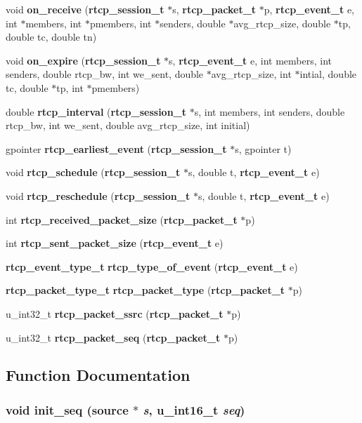 \begin{CompactItemize}
\item 
void {\bf on\_\-receive} ({\bf rtcp\_\-session\_\-t} $\ast$s, {\bf rtcp\_\-packet\_\-t} $\ast$p, {\bf rtcp\_\-event\_\-t} e, int $\ast$members, int $\ast$pmembers, int $\ast$senders, double $\ast$avg\_\-rtcp\_\-size, double $\ast$tp, double tc, double tn)
\item 
void {\bf on\_\-expire} ({\bf rtcp\_\-session\_\-t} $\ast$s, {\bf rtcp\_\-event\_\-t} e, int members, int senders, double rtcp\_\-bw, int we\_\-sent, double $\ast$avg\_\-rtcp\_\-size, int $\ast$intial, double tc, double $\ast$tp, int $\ast$pmembers)
\item 
double {\bf rtcp\_\-interval} ({\bf rtcp\_\-session\_\-t} $\ast$s, int members, int senders, double rtcp\_\-bw, int we\_\-sent, double avg\_\-rtcp\_\-size, int initial)
\item 
gpointer {\bf rtcp\_\-earliest\_\-event} ({\bf rtcp\_\-session\_\-t} $\ast$s, gpointer t)
\item 
void {\bf rtcp\_\-schedule} ({\bf rtcp\_\-session\_\-t} $\ast$s, double t, {\bf rtcp\_\-event\_\-t} e)
\item 
void {\bf rtcp\_\-reschedule} ({\bf rtcp\_\-session\_\-t} $\ast$s, double t, {\bf rtcp\_\-event\_\-t} e)
\item 
int {\bf rtcp\_\-received\_\-packet\_\-size} ({\bf rtcp\_\-packet\_\-t} $\ast$p)
\item 
int {\bf rtcp\_\-sent\_\-packet\_\-size} ({\bf rtcp\_\-event\_\-t} e)
\item 
{\bf rtcp\_\-event\_\-type\_\-t} {\bf rtcp\_\-type\_\-of\_\-event} ({\bf rtcp\_\-event\_\-t} e)
\item 
{\bf rtcp\_\-packet\_\-type\_\-t} {\bf rtcp\_\-packet\_\-type} ({\bf rtcp\_\-packet\_\-t} $\ast$p)
\item 
u\_\-int32\_\-t {\bf rtcp\_\-packet\_\-ssrc} ({\bf rtcp\_\-packet\_\-t} $\ast$p)
\item 
u\_\-int32\_\-t {\bf rtcp\_\-packet\_\-seq} ({\bf rtcp\_\-packet\_\-t} $\ast$p)
\end{CompactItemize}


\subsection{Function Documentation}
\subsubsection{\setlength{\rightskip}{0pt plus 5cm}void init\_\-seq ({\bf source} $\ast$ {\em s}, u\_\-int16\_\-t {\em seq})\hspace{0.3cm}{\tt  [static]}}\label{rtcp_8h_a11}


